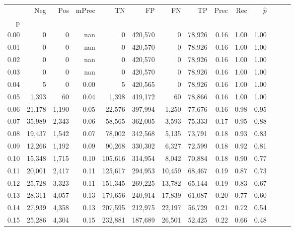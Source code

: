 \begin{tabular}{rrrrrrrrrrrrrr}
\toprule
{} &     Neg &    Pos & mPrec &       TN &       FP &      FN &      TP &  Prec &   Rec & $\hat{p}$ \\
p    &         &        &       &          &          &         &         &       &       &           \\
\midrule
0.00 &       0 &      0 &   nan &        0 &  420,570 &       0 &  78,926 &  0.16 &  1.00 &      1.00 \\
0.01 &       0 &      0 &   nan &        0 &  420,570 &       0 &  78,926 &  0.16 &  1.00 &      1.00 \\
0.02 &       0 &      0 &   nan &        0 &  420,570 &       0 &  78,926 &  0.16 &  1.00 &      1.00 \\
0.03 &       0 &      0 &   nan &        0 &  420,570 &       0 &  78,926 &  0.16 &  1.00 &      1.00 \\
0.04 &       5 &      0 &  0.00 &        5 &  420,565 &       0 &  78,926 &  0.16 &  1.00 &      1.00 \\
0.05 &   1,393 &     60 &  0.04 &    1,398 &  419,172 &      60 &  78,866 &  0.16 &  1.00 &      1.00 \\
0.06 &  21,178 &  1,190 &  0.05 &   22,576 &  397,994 &   1,250 &  77,676 &  0.16 &  0.98 &      0.95 \\
0.07 &  35,989 &  2,343 &  0.06 &   58,565 &  362,005 &   3,593 &  75,333 &  0.17 &  0.95 &      0.88 \\
0.08 &  19,437 &  1,542 &  0.07 &   78,002 &  342,568 &   5,135 &  73,791 &  0.18 &  0.93 &      0.83 \\
0.09 &  12,266 &  1,192 &  0.09 &   90,268 &  330,302 &   6,327 &  72,599 &  0.18 &  0.92 &      0.81 \\
0.10 &  15,348 &  1,715 &  0.10 &  105,616 &  314,954 &   8,042 &  70,884 &  0.18 &  0.90 &      0.77 \\
0.11 &  20,001 &  2,417 &  0.11 &  125,617 &  294,953 &  10,459 &  68,467 &  0.19 &  0.87 &      0.73 \\
0.12 &  25,728 &  3,323 &  0.11 &  151,345 &  269,225 &  13,782 &  65,144 &  0.19 &  0.83 &      0.67 \\
0.13 &  28,311 &  4,057 &  0.13 &  179,656 &  240,914 &  17,839 &  61,087 &  0.20 &  0.77 &      0.60 \\
0.14 &  27,939 &  4,358 &  0.13 &  207,595 &  212,975 &  22,197 &  56,729 &  0.21 &  0.72 &      0.54 \\
0.15 &  25,286 &  4,304 &  0.15 &  232,881 &  187,689 &  26,501 &  52,425 &  0.22 &  0.66 &      0.48 \\

\end{tabular}
